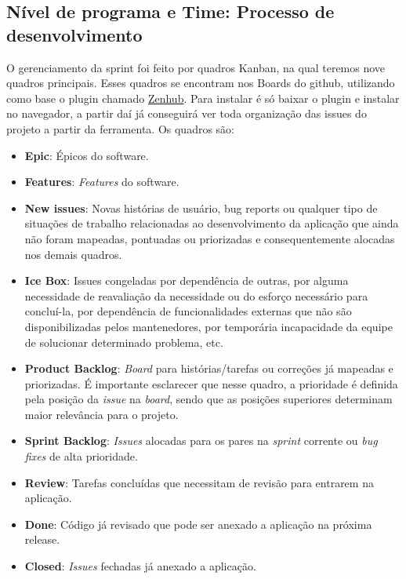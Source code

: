 \subsection{Nível de programa e Time: Processo de desenvolvimento}

O gerenciamento da sprint foi feito por quadros Kanban, na qual teremos nove quadros principais. Esses quadros se encontram nos Boards do github, utilizando como base o plugin chamado \href{https://www.zenhub.com/}{Zenhub}. Para instalar é só baixar o plugin e instalar no navegador, a partir daí já conseguirá ver toda organização das issues do projeto a partir da ferramenta. Os quadros são:

\begin{itemize}
  \item \textbf{Epic}: Épicos do software.
  \item \textbf{Features}: \textit{Features} do software.
  \item \textbf{New issues}: Novas histórias de usuário, bug reports ou qualquer tipo de situações de trabalho relacionadas ao desenvolvimento da aplicação que ainda não foram mapeadas, pontuadas ou priorizadas e consequentemente alocadas nos demais quadros.
  \item \textbf{Ice Box}: Issues congeladas por dependência de outras, por alguma necessidade de reavaliação da necessidade ou do esforço necessário para concluí-la, por dependência de funcionalidades externas que não são disponibilizadas pelos mantenedores, por temporária incapacidade da equipe de solucionar determinado problema, etc.
  \item \textbf{Product Backlog}: \textit{Board} para histórias/tarefas ou correções já mapeadas e priorizadas. É importante esclarecer que nesse quadro, a prioridade é definida pela posição da \textit{issue} na \textit{board}, sendo que as posições superiores determinam maior relevância para o projeto.
  \item \textbf{Sprint Backlog}: \textit{Issues} alocadas para os pares na \textit{sprint} corrente ou \textit{bug fixes} de alta prioridade.
  \item \textbf{Review}: Tarefas concluídas que necessitam de revisão para entrarem na aplicação.
  \item \textbf{Done}: Código já revisado que pode ser anexado a aplicação na próxima release.
  \item \textbf{Closed}: \textit{Issues} fechadas já anexado a aplicação.
\end{itemize}

